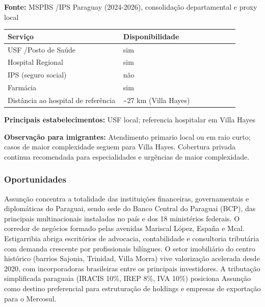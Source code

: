 \textbf{Fonte:} MSPBS /\allowbreak \allowbreak  IPS Paraguay (2024-2026), consolidação
departamental e proxy local

{\def\LTcaptype{none} %
\begin{longtable}{@{}>{\raggedright\arraybackslash}p{0.45\linewidth} >{\raggedright\arraybackslash}p{0.45\linewidth}@{}}
\toprule\noalign{}
Serviço & Disponibilidade \\
\midrule\noalign{}
\endhead
\bottomrule\noalign{}
\endlastfoot
USF /\allowbreak \allowbreak  Posto de Saúde & sim \\
Hospital Regional & sim \\
IPS (seguro social) & não \\
Farmácia & sim \\
Distância ao hospital de referência & \textasciitilde27 km (Villa
Hayes) \\
\end{longtable}
}

\textbf{Principais estabelecimentos:} USF local; referencia hospitalar
em Villa Hayes

\textbf{Observação para imigrantes:} Atendimento primario local ou em
raio curto; casos de maior complexidade seguem para Villa Hayes.
Cobertura privada continua recomendada para especialidades e urgências
de maior complexidade.

\subsubsection*{Oportunidades}\label{oport-asuncion-0000}
Assunção concentra a totalidade das instituições financeiras, governamentais e diplomáticas do Paraguai, sendo sede do Banco Central do Paraguai (BCP), das principais multinacionais instaladas no país e dos 18 ministérios federais. O corredor de negócios formado pelas avenidas Mariscal López, España e Mcal. Estigarribia abriga escritórios de advocacia, contabilidade e consultoria tributária com demanda crescente por profissionais bilíngues. O setor imobiliário do centro histórico (barrios Sajonia, Trinidad, Villa Morra) vive valorização acelerada desde 2020, com incorporadoras brasileiras entre os principais investidores. A tributação simplificada paraguaia (IRACIS 10\%, IREP 8\%, IVA 10\%) posiciona Assunção como destino preferencial para estruturação de holdings e empresas de exportação para o Mercosul.

